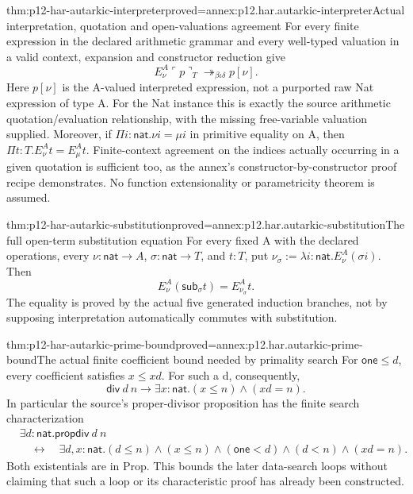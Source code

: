 \begin{hbtheorem}{thm:p12-har-autarkic-interpreter}{proved=annex:p12.har.autarkic-interpreter}{Actual interpretation, quotation and open-valuations agreement}
For every finite expression in the declared arithmetic grammar and every
well-typed valuation in a valid context, expansion and constructor reduction
give
\[
 E_\nu^A\ulcorner p\urcorner_T
            \twoheadrightarrow_{\beta\iota\delta}p[\nu].
\]
Here \(p[\nu]\) is the A-valued interpreted expression, not a
purported raw Nat expression of type A. For the Nat instance this is
exactly the source arithmetic quotation/evaluation relationship, with
the missing free-variable valuation supplied. Moreover, if
\(\Pi i:\mathsf{nat}.\nu i=\mu i\) in primitive equality on A,
then \(\Pi t:T.E_\nu^A t=E_\mu^A t\). Finite-context agreement on
the indices actually occurring in a given quotation is sufficient too,
as the annex's constructor-by-constructor proof recipe demonstrates.
No function extensionality or parametricity theorem is assumed.
\end{hbtheorem}

\begin{hbtheorem}{thm:p12-har-autarkic-substitution}{proved=annex:p12.har.autarkic-substitution}{The full open-term substitution equation}
For every fixed A with the declared operations, every
\(\nu:\mathsf{nat}\to A\), \(\sigma:\mathsf{nat}\to T\), and
\(t:T\), put \(\nu_\sigma:=\lambda i:\mathsf{nat}.E_\nu^A(\sigma i)\).
Then
\[
 E_\nu^A(\mathsf{sub}_\sigma t)=E_{\nu_\sigma}^A t.
\]
The equality is proved by the actual five generated induction branches,
not by supposing interpretation automatically commutes with substitution.
\end{hbtheorem}

\begin{hblemma}{thm:p12-har-autarkic-prime-bound}{proved=annex:p12.har.autarkic-prime-bound}{The actual finite coefficient bound needed by primality search}
For \(\mathsf{one}\le d\), every coefficient satisfies
\(x\le xd\). For such a d, consequently,
\[
 \mathsf{div}\ d\ n\to
      \exists x:\mathsf{nat}.(x\le n)\wedge(xd=n).
\]
In particular the source's proper-divisor proposition has the finite
search characterization
\[
\begin{aligned}
 &\exists d:\mathsf{nat}.\mathsf{propdiv}\ d\ n\\
 &\quad\longleftrightarrow\quad
 \exists d,x:\mathsf{nat}.
  (d\le n)\wedge(x\le n)\wedge(\mathsf{one}<d)\wedge(d<n)\wedge(xd=n).
\end{aligned}
\]
Both existentials are in Prop. This bounds the later data-search loops
without claiming that such a loop or its characteristic proof has already
been constructed.
\end{hblemma}


